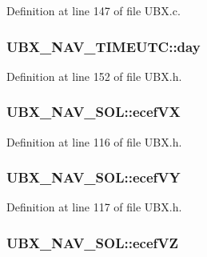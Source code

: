 Definition at line 147 of file U\-B\-X.\-c.

\hypertarget{group___g_s_p_module_gaf47b128d3c65964f825c689849546c6d}{
\subsubsection[{day}]{ U\-B\-X\-\_\-\-N\-A\-V\-\_\-\-T\-I\-M\-E\-U\-T\-C\-::day}}\label{group___g_s_p_module_gaf47b128d3c65964f825c689849546c6d}


Definition at line 152 of file U\-B\-X.\-h.

\hypertarget{group___g_s_p_module_gaafca9f9204a38e9bb1646848cafcfb38}{
\subsubsection[{ecef\-V\-X}]{ U\-B\-X\-\_\-\-N\-A\-V\-\_\-\-S\-O\-L\-::ecef\-V\-X}}\label{group___g_s_p_module_gaafca9f9204a38e9bb1646848cafcfb38}


Definition at line 116 of file U\-B\-X.\-h.

\hypertarget{group___g_s_p_module_ga579b66433d3effbb0ad527acae2f8379}{
\subsubsection[{ecef\-V\-Y}]{ U\-B\-X\-\_\-\-N\-A\-V\-\_\-\-S\-O\-L\-::ecef\-V\-Y}}\label{group___g_s_p_module_ga579b66433d3effbb0ad527acae2f8379}


Definition at line 117 of file U\-B\-X.\-h.

\hypertarget{group___g_s_p_module_ga3bc6214c289d81550f8750382540c2ec}{
\subsubsection[{ecef\-V\-Z}]{ U\-B\-X\-\_\-\-N\-A\-V\-\_\-\-S\-O\-L\-::ecef\-V\-Z}}\label{group___g_s_p_module_ga3bc6214c289d81550f8750382540c2ec}


